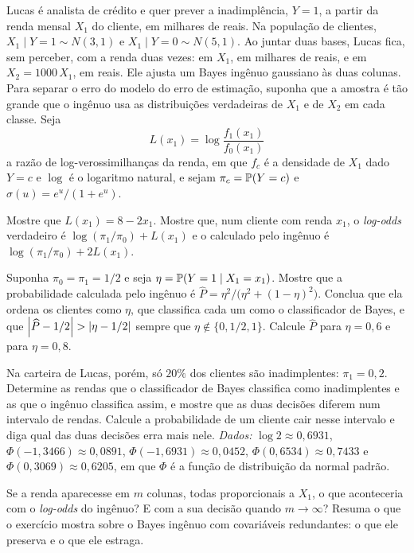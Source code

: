 Lucas é analista de crédito e quer prever a inadimplência, $Y=1$, a partir da renda
mensal $X_1$ do cliente, em milhares de reais. Na população de clientes,
$X_1\mid Y=1\sim N(3,1)$ e $X_1\mid Y=0\sim N(5,1)$. Ao juntar duas bases, Lucas fica,
sem perceber, com a renda duas vezes: em $X_1$, em milhares de reais, e em $X_2=1000\,X_1$,
em reais. Ele ajusta um Bayes ingênuo gaussiano às duas colunas. Para separar o erro do
modelo do erro de estimação, suponha que a amostra é tão grande que o ingênuo usa as
distribuições verdadeiras de $X_1$ e de $X_2$ em cada classe. Seja
\[
  L(x_1)=\log\frac{f_1(x_1)}{f_0(x_1)}
\]
a razão de log-verossimilhanças da renda, em que $f_c$ é a densidade de $X_1$ dado $Y=c$
e $\log$ é o logaritmo natural, e sejam $\pi_c=\mathbb{P}(Y=c)$ e $\sigma(u)=e^u/(1+e^u)$.
\begin{itens}
  \item {} Mostre que $L(x_1)=8-2x_1$. Mostre que, num cliente com renda $x_1$, o
        \emph{log-odds} verdadeiro é $\log(\pi_1/\pi_0)+L(x_1)$ e o calculado pelo
        ingênuo é $\log(\pi_1/\pi_0)+2L(x_1)$.
  \item {} Suponha $\pi_0=\pi_1=1/2$ e seja $\eta=\mathbb{P}(Y=1\mid X_1=x_1)$. Mostre
        que a probabilidade calculada pelo ingênuo é
        $\widehat P=\eta^2/\big(\eta^2+(1-\eta)^2\big)$. Conclua que ela ordena os
        clientes como $\eta$, que classifica cada um como o classificador de Bayes, e que
        $\left\lvert \widehat P-1/2 \right\rvert>\left\lvert \eta-1/2 \right\rvert$ sempre que $\eta\notin\{0,1/2,1\}$.
        Calcule $\widehat P$ para $\eta=0{,}6$ e para $\eta=0{,}8$.
  \item {} Na carteira de Lucas, porém, só $20\%$ dos clientes são inadimplentes:
        $\pi_1=0{,}2$. Determine as rendas que o classificador de Bayes classifica como
        inadimplentes e as que o ingênuo classifica assim, e mostre que as duas decisões
        diferem num intervalo de rendas. Calcule a probabilidade de um cliente cair nesse
        intervalo e diga qual das duas decisões erra mais nele. \emph{Dados:}
        $\log2\approx0{,}6931$, $\Phi(-1{,}3466)\approx0{,}0891$,
        $\Phi(-1{,}6931)\approx0{,}0452$, $\Phi(0{,}6534)\approx0{,}7433$ e
        $\Phi(0{,}3069)\approx0{,}6205$, em que $\Phi$ é a função de distribuição da
        normal padrão.
  \item {} Se a renda aparecesse em $m$ colunas, todas proporcionais a $X_1$, o que
        aconteceria com o \emph{log-odds} do ingênuo? E com a sua decisão quando
        $m\to\infty$? Resuma o que o exercício mostra sobre o Bayes ingênuo com
        covariáveis redundantes: o que ele preserva e o que ele estraga.
\end{itens}

